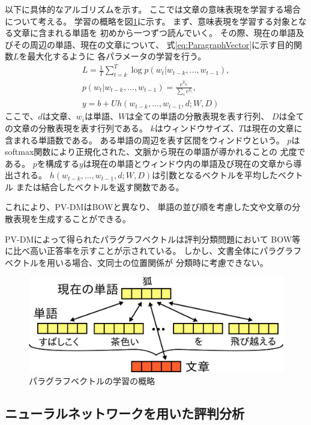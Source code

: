 \documentclass[twocolumn,a4paper]{ltjarticle}
\makeatletter
\let\tti@includegraphics\includegraphics
\renewcommand{\includegraphics}[1]{%
    \tti@includegraphics[width=\linewidth]{#1}}
\makeatother
\begin{document}
以下に具体的なアルゴリズムを示す。
ここでは文章の意味表現を学習する場合について考える。
学習の概略を図\ref{fig:ParagraphVector}に示す。
まず、意味表現を学習する対象となる文章に含まれる単語を
初めから一つずつ読んでいく。
その際、現在の単語及びその周辺の単語、現在の文章について、
式\ref{eq:ParagraphVector}に示す目的関数$L$を最大化するように
各パラメータの学習を行う。
\begin{gather}
  L = \frac{1}{T} \sum^{T}_{t = k} \log p(w_t | w_{t-k}, ..., w_{t-1}),
    \label{eq:ParagraphVector} \\
  p(w_t | w_{t-k}, ..., w_{t-1}) = \frac{e^{y_{w_t}}}{\sum_i e^{y_i}},
    \nonumber \\
  y = b + Uh(w_{t-k}, ..., w_{t-1}, d; W, D) \nonumber
\end{gather}
ここで、$d$は文章、$w_i$は単語、$W$は全ての単語の分散表現を表す行列、
$D$は全ての文章の分散表現を表す行列である。
$k$はウィンドウサイズ、$T$は現在の文章に含まれる単語数である。
ある単語の周辺を表す区間をウィンドウという。
$p$はsoftmax関数により正規化された、文脈から現在の単語が導かれることの
尤度である。
$p$を構成する$y$は現在の単語とウィンドウ内の単語及び現在の文章から導出される。
$h(w_{t-k}, ..., w_{t-1}, d; W, D)$は引数となるベクトルを平均したベクトル
または結合したベクトルを返す関数である。

これにより、PV-DMはBOWと異なり、
単語の並び順を考慮した文や文章の分散表現を生成することができる。

PV-DMによって得られたパラグラフベクトルは評判分類問題において
BOW等に比べ高い正答率を示すことが示されている。
しかし、文書全体にパラグラフベクトルを用いる場合、文同士の位置関係が
分類時に考慮できない。

\begin{figure}[t!]
  \includegraphics{fig/paragraph_vector.png}
  \caption{パラグラフベクトルの学習の概略}
  \label{fig:ParagraphVector}
\end{figure}


\subsection{ニューラルネットワークを用いた評判分析}
\end{document}
